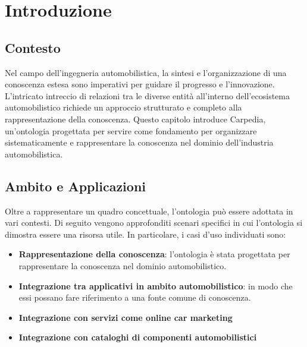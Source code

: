 \chapter{Introduzione}

\section{Contesto}
Nel campo dell'ingegneria automobilistica, la sintesi e l'organizzazione di una conoscenza estesa sono imperativi per guidare il progresso e l'innovazione. L'intricato intreccio di relazioni tra le diverse entità all'interno dell'ecosistema automobilistico richiede un approccio strutturato e completo alla rappresentazione della conoscenza. Questo capitolo introduce Carpedia, un'ontologia progettata per servire come fondamento per organizzare sistematicamente e rappresentare la conoscenza nel dominio dell'industria automobilistica.

\section{Ambito e Applicazioni}
Oltre a rappresentare un quadro concettuale, l'ontologia può essere adottata in vari contesti. Di seguito vengono approfonditi scenari specifici in cui l'ontologia si dimostra essere una risorsa utile. In particolare, i casi d'uso individuati sono:

\begin{itemize}
    \item \textbf{Rappresentazione della conoscenza}: l'ontologia è stata progettata per rappresentare la conoscenza nel dominio automobilistico.
    \item \textbf{Integrazione tra applicativi in ambito automobilistico}: in modo che essi possano fare riferimento a una fonte comune di conoscenza.
    \item \textbf{Integrazione con servizi come online car marketing}
    \item \textbf{Integrazione con cataloghi di componenti automobilistici}
\end{itemize}
